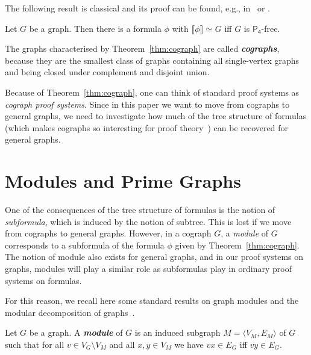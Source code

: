\documentclass{lmcs} %
\newcommand{\isom}[1][]{\simeq_{#1}}
\def\defn#1{\emph{\bfseries\boldmath #1}}
\def\tuple#1{\langle#1\rangle}
\def\gG{G}
\def\gM{M}
\newcommand{\vertices}[1][]{V_{#1}}
\newcommand{\gEdges}[1][]{E_{#1}}
\newcommand{\vG}{\vertices[G]}
\newcommand{\eG}{\gEdges[G]}
\newcommand{\vM}{\vertices[M]}
\newcommand{\eM}{\gEdges[M]}
\newcommand{\graphof}[1]{\llbracket#1\rrbracket}
\theoremstyle{plain}
\def\pfour{\mathsf{P_4}}
\begin{document}
The following result is classical and its proof can be found, e.g., in~\cite{moh:89} or \cite{gug:SIS}.
\begin{thm}\label{thm:cograph}
  Let $\gG$ be a graph. Then there is a formula $\phi$ with $\graphof\phi\isom G$ iff $\gG$ is $\pfour$-free.
\end{thm}



The graphs characterised by Theorem~\ref{thm:cograph}
are called \defn{cographs}, because they are the smallest class of
graphs containing all single-vertex graphs and being closed under
complement and disjoint union.

Because of Theorem~\ref{thm:cograph}, one can think of standard proof
systems as \emph{cograph proof systems}. 
Since in this paper we want to move from cographs to general graphs, 
we need to investigate how much of the tree structure of formulas 
(which makes cographs so interesting for proof theory~\cite{retore:03,hughes:pws,str:FSCD17})
can be recovered for general graphs.



\section{Modules and Prime Graphs}\label{sec:modules}

One of the consequences of the tree structure of formulas is the notion of \emph{subformula}, which is induced by the notion of subtree. This is lost if we move from cographs to general graphs. However, in a cograph $\gG$, a \emph{module} of $\gG$ corresponds to a subformula of the formula $\phi$ given by Theorem~\ref{thm:cograph}. The notion of module also exists for general graphs, and in our proof systems on graphs, modules will play a similar role as subformulas play in ordinary proof systems on formulas.   

For this reason, we recall here some standard results on graph modules and the modular decomposition of graphs~\cite{moh:rad,ehr:har:roz:theory,cou:del:modular,hab:paul:survey}.

\begin{defi}\label{def:module}
  Let $\gG$ be a graph. A \defn{module} of $\gG$ is an induced
  subgraph $\gM=\tuple{\vM,\eM}$ of $\gG$ such that for all
  $v\in\vG\setminus\vM$ and all $x,y\in \vM$ we have $vx\in\eG$ iff
  $vy\in\eG$.
\end{defi}
\end{document}
